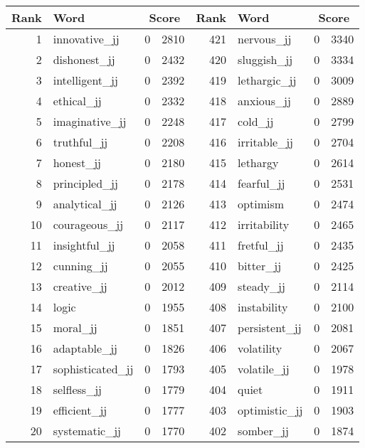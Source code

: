 \begin{table}[tbp]
    \begin{tabular}{| rlr@{.}l | rlr@{.}l |}
    \hline
    \textbf{Rank} & \textbf{Word} & \multicolumn{2}{c|}{\textbf{Score}} & \textbf{Rank} & \textbf{Word} & \multicolumn{2}{c|}{\textbf{Score}} \\
    \hline
    1 & innovative\_jj & 0 & 2810    &    421 & nervous\_jj & 0 & 3340 \\
    2 & dishonest\_jj & 0 & 2432    &    420 & sluggish\_jj & 0 & 3334 \\
    3 & intelligent\_jj & 0 & 2392    &    419 & lethargic\_jj & 0 & 3009 \\
    4 & ethical\_jj & 0 & 2332    &    418 & anxious\_jj & 0 & 2889 \\
    5 & imaginative\_jj & 0 & 2248    &    417 & cold\_jj & 0 & 2799 \\
    6 & truthful\_jj & 0 & 2208    &    416 & irritable\_jj & 0 & 2704 \\
    7 & honest\_jj & 0 & 2180    &    415 & lethargy & 0 & 2614 \\
    8 & principled\_jj & 0 & 2178    &    414 & fearful\_jj & 0 & 2531 \\
    9 & analytical\_jj & 0 & 2126    &    413 & optimism & 0 & 2474 \\
    10 & courageous\_jj & 0 & 2117    &    412 & irritability & 0 & 2465 \\
    11 & insightful\_jj & 0 & 2058    &    411 & fretful\_jj & 0 & 2435 \\
    12 & cunning\_jj & 0 & 2055    &    410 & bitter\_jj & 0 & 2425 \\
    13 & creative\_jj & 0 & 2012    &    409 & steady\_jj & 0 & 2114 \\
    14 & logic & 0 & 1955    &    408 & instability & 0 & 2100 \\
    15 & moral\_jj & 0 & 1851    &    407 & persistent\_jj & 0 & 2081 \\
    16 & adaptable\_jj & 0 & 1826    &    406 & volatility & 0 & 2067 \\
    17 & sophisticated\_jj & 0 & 1793    &    405 & volatile\_jj & 0 & 1978 \\
    18 & selfless\_jj & 0 & 1779    &    404 & quiet & 0 & 1911 \\
    19 & efficient\_jj & 0 & 1777    &    403 & optimistic\_jj & 0 & 1903 \\
    20 & systematic\_jj & 0 & 1770    &    402 & somber\_jj & 0 & 1874 \\

\end{tabular}
\end{table}
